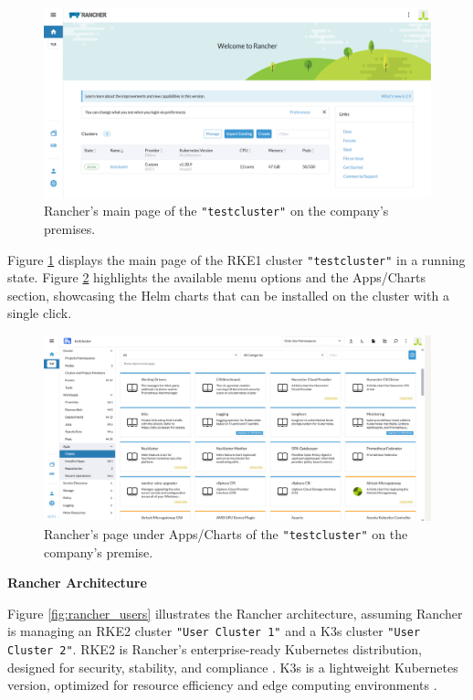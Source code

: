 \documentclass[../main.tex]{subfiles}
\begin{document}
\begin{figure}[H]
    \centering
    \includegraphics[scale=0.4]{img/2-background/rancher/rancher-gui.png}
    \caption{Rancher’s main page of the \texttt{"testcluster"} on the company's premises.}
    \label{fig:rancher_gui}
\end{figure}

Figure \ref{fig:rancher_gui} displays the main page of the RKE1 cluster \texttt{"testcluster"} in a running state. Figure \ref{fig:rancher_gui_apps} highlights the available menu options and the Apps/Charts section, showcasing the Helm charts that can be installed on the cluster with a single click.
\begin{figure}[H]
    \centering
    \includegraphics[scale=0.4]{img/2-background/rancher/rancher_gui_apps.png}
    \caption{Rancher’s page under Apps/Charts of the \texttt{"testcluster"} on the company's premise.}
    \label{fig:rancher_gui_apps}
\end{figure}

\textbf{Rancher Architecture}

Figure \ref{fig:rancher_users} illustrates the Rancher architecture, assuming Rancher is managing an RKE2 cluster \texttt{"User Cluster 1"} and a K3s cluster \texttt{"User Cluster 2"}.
RKE2 is Rancher's enterprise-ready Kubernetes distribution, designed for security, stability, and compliance \cite{rke2}. K3s is a lightweight Kubernetes version, optimized for resource efficiency and edge computing environments \cite{K3s}.
\end{document}
